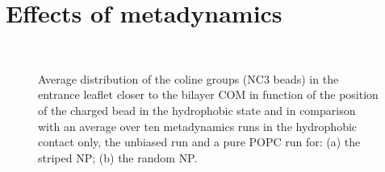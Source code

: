\section{Effects of metadynamics}

\begin{figure}[p]
	\center
	\\%
	\caption{Average distribution of the coline groups (NC3 beads) in the entrance leaflet closer to the bilayer \acs{COM} in function of the position of the charged bead in the hydrophobic state and in comparison with an average over ten metadynamics runs in the hydrophobic contact only, the unbiased run and a pure \acs{POPC} run for: (a) the striped \acs{NP}; (b) the random \acs{NP}.}
\end{figure}

